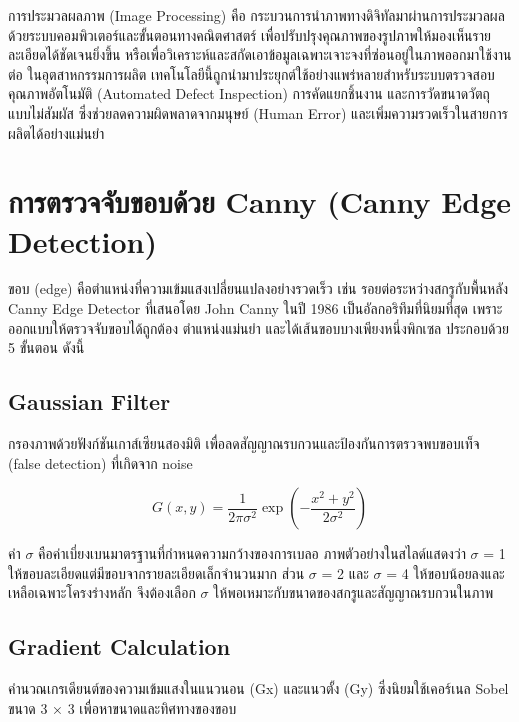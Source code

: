 การประมวลผลภาพ (Image Processing) คือ กระบวนการนำภาพทางดิจิทัลมาผ่านการประมวลผลด้วยระบบคอมพิวเตอร์และขั้นตอนทางคณิตศาสตร์ เพื่อปรับปรุงคุณภาพของรูปภาพให้มองเห็นรายละเอียดได้ชัดเจนยิ่งขึ้น หรือเพื่อวิเคราะห์และสกัดเอาข้อมูลเฉพาะเจาะจงที่ซ่อนอยู่ในภาพออกมาใช้งานต่อ ในอุตสาหกรรมการผลิต เทคโนโลยีนี้ถูกนำมาประยุกต์ใช้อย่างแพร่หลายสำหรับระบบตรวจสอบคุณภาพอัตโนมัติ (Automated Defect Inspection) การคัดแยกชิ้นงาน และการวัดขนาดวัตถุแบบไม่สัมผัส ซึ่งช่วยลดความผิดพลาดจากมนุษย์ (Human Error) และเพิ่มความรวดเร็วในสายการผลิตได้อย่างแม่นยำ \cite{dia2024,ikki2023}

\section{การตรวจจับขอบด้วย Canny (Canny Edge Detection)}

ขอบ (edge) คือตำแหน่งที่ความเข้มแสงเปลี่ยนแปลงอย่างรวดเร็ว เช่น รอยต่อระหว่างสกรูกับพื้นหลัง Canny Edge Detector ที่เสนอโดย John Canny ในปี 1986 เป็นอัลกอริทึมที่นิยมที่สุด เพราะออกแบบให้ตรวจจับขอบได้ถูกต้อง ตำแหน่งแม่นยำ และได้เส้นขอบบางเพียงหนึ่งพิกเซล \cite{opencvCanny2024,wikipediaCanny2024,canny1986} ประกอบด้วย 5 ขั้นตอน ดังนี้

\subsection{Gaussian Filter}

กรองภาพด้วยฟังก์ชันเกาส์เซียนสองมิติ เพื่อลดสัญญาณรบกวนและป้องกันการตรวจพบขอบเท็จ (false detection) ที่เกิดจาก noise

\begin{equation}\label{eq:gaussian-filter}
  G(x,y) = \frac{1}{2\pi\sigma^2} \exp\left(-\frac{x^2+y^2}{2\sigma^2}\right)
\end{equation}

ค่า $σ$ คือค่าเบี่ยงเบนมาตรฐานที่กำหนดความกว้างของการเบลอ ภาพตัวอย่างในสไลด์แสดงว่า $σ$ = 1 ให้ขอบละเอียดแต่มีขอบจากรายละเอียดเล็กจำนวนมาก ส่วน $σ$ = 2 และ $σ$ = 4 ให้ขอบน้อยลงและเหลือเฉพาะโครงร่างหลัก จึงต้องเลือก $σ$ ให้พอเหมาะกับขนาดของสกรูและสัญญาณรบกวนในภาพ

\subsection{Gradient Calculation}

คำนวณเกรเดียนต์ของความเข้มแสงในแนวนอน (Gx) และแนวตั้ง (Gy) ซึ่งนิยมใช้เคอร์เนล Sobel ขนาด 3 × 3 เพื่อหาขนาดและทิศทางของขอบ \cite{firstprinciples2021canny}

